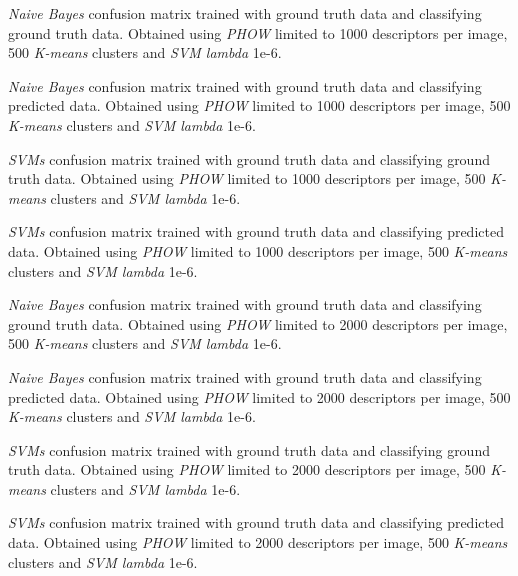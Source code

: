\documentclass[12pt,a4paper]{article}
\begin{document}
\begin{singlespace}
{\emph{Naive Bayes} confusion matrix trained with ground truth data and classifying ground truth data. Obtained using \emph{PHOW} limited to 1000 descriptors per image, 500 \emph{K-means} clusters and \emph{SVM lambda} 1e-6.}

{\emph{Naive Bayes} confusion matrix trained with ground truth data and classifying predicted data. Obtained using \emph{PHOW} limited to 1000 descriptors per image, 500 \emph{K-means} clusters and \emph{SVM lambda} 1e-6.}

{\emph{SVMs} confusion matrix trained with ground truth data and classifying ground truth data. Obtained using \emph{PHOW} limited to 1000 descriptors per image, 500 \emph{K-means} clusters and \emph{SVM lambda} 1e-6.}

{\emph{SVMs} confusion matrix trained with ground truth data and classifying predicted data. Obtained using \emph{PHOW} limited to 1000 descriptors per image, 500 \emph{K-means} clusters and \emph{SVM lambda} 1e-6.}

{\emph{Naive Bayes} confusion matrix trained with ground truth data and classifying ground truth data. Obtained using \emph{PHOW} limited to 2000 descriptors per image, 500 \emph{K-means} clusters and \emph{SVM lambda} 1e-6.}

{\emph{Naive Bayes} confusion matrix trained with ground truth data and classifying predicted data. Obtained using \emph{PHOW} limited to 2000 descriptors per image, 500 \emph{K-means} clusters and \emph{SVM lambda} 1e-6.}

{\emph{SVMs} confusion matrix trained with ground truth data and classifying ground truth data. Obtained using \emph{PHOW} limited to 2000 descriptors per image, 500 \emph{K-means} clusters and \emph{SVM lambda} 1e-6.}

{\emph{SVMs} confusion matrix trained with ground truth data and classifying predicted data. Obtained using \emph{PHOW} limited to 2000 descriptors per image, 500 \emph{K-means} clusters and \emph{SVM lambda} 1e-6.}


\end{singlespace}
\end{document}
